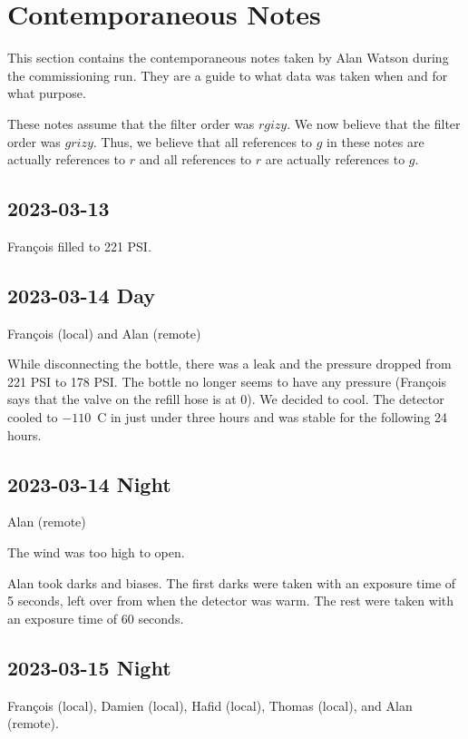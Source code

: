 \documentclass{article}
\begin{document}
\clearpage
\appendix
\section{Contemporaneous Notes}
\label{appendix:notes}

This section contains the contemporaneous notes taken by Alan Watson during the commissioning run. They are a guide to what data was taken when and for what purpose.

These notes assume that the filter order was $rgizy$. We now believe that the filter order was $grizy$. Thus, we believe that all references to $g$ in these notes are actually references to $r$ and all references to $r$ are actually references to $g$.

\subsection{2023-03-13}

François filled to 221 PSI.

\subsection{2023-03-14 Day}

François (local) and Alan (remote)

While disconnecting the bottle, there was a leak and the pressure dropped from 221 PSI to 178 PSI. The bottle no longer seems to have any pressure (François says that the valve on the refill hose is at 0). We decided to cool. The detector cooled to $-110$~C in just under three hours and was stable for the following 24 hours.

\subsection{2023-03-14 Night}

Alan (remote)

The wind was too high to open.

Alan took darks and biases. The first darks were taken with an exposure time of 5 seconds, left over from when the detector was warm. The rest were taken with an exposure time of 60 seconds.

\subsection{2023-03-15 Night}

François (local), Damien (local), Hafid (local), Thomas (local), and Alan (remote).
\end{document}
